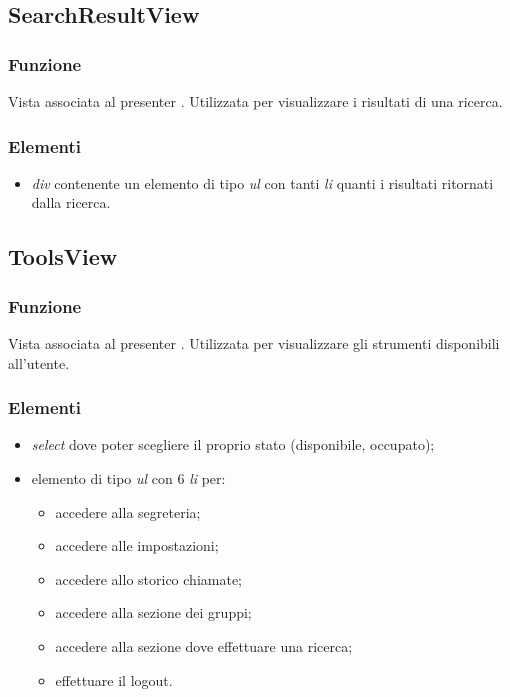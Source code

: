 \subsection{SearchResultView}
\subsubsection*{Funzione}
Vista associata al presenter . Utilizzata per visualizzare i risultati di una ricerca.
\subsubsection*{Elementi}
\begin{itemize}
\item \textit{div} contenente un elemento di tipo \textit{ul} con tanti \textit{li} quanti i risultati ritornati dalla ricerca.
\end{itemize}

\subsection{ToolsView}
\subsubsection*{Funzione}
Vista associata al presenter . Utilizzata per visualizzare gli strumenti disponibili all'utente.
\subsubsection*{Elementi}
\begin{itemize}
\item \textit{select} dove poter scegliere il proprio stato (disponibile, occupato);
\item elemento di tipo \textit{ul} con 6 \textit{li} per:
\begin{itemize}
\item accedere alla segreteria;
\item accedere alle impostazioni;
\item accedere allo storico chiamate;
\item accedere alla sezione dei gruppi;
\item accedere alla sezione dove effettuare una ricerca;
\item effettuare il logout.
\end{itemize}
\end{itemize}




